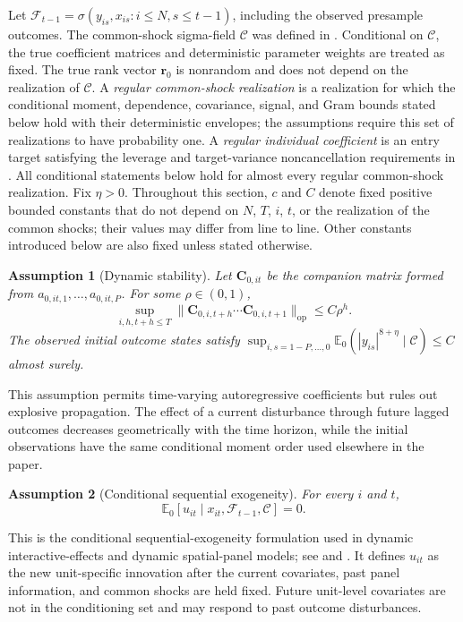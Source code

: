 \documentclass[11pt]{article}
\numberwithin{equation}{section}
\newtheorem{assumption}{Assumption}
\theoremstyle{remark}
\newcommand{\Ezero}{\mathbb E_0}
\newcommand{\op}{\operatorname{op}}
\newcommand{\br}{\bm r}
\newcommand{\bC}{\bm C}
\begin{document}
Let $\mathscr F_{t-1}=\sigma(y_{is},x_{is}:i\le N,s\le t-1)$, including the observed presample outcomes. The common-shock sigma-field $\mathscr C$ was defined in . Conditional on $\mathscr C$, the true coefficient matrices and deterministic parameter weights are treated as fixed. The true rank vector $\br_0$ is nonrandom and does not depend on the realization of $\mathscr C$. A \emph{regular common-shock realization} is a realization for which the conditional moment, dependence, covariance, signal, and Gram bounds stated below hold with their deterministic envelopes; the assumptions require this set of realizations to have probability one. A \emph{regular individual coefficient} is an entry target satisfying the leverage and target-variance noncancellation requirements in . All conditional statements below hold for almost every regular common-shock realization. Fix $\eta>0$. Throughout this section, $c$ and $C$ denote fixed positive bounded constants that do not depend on $N$, $T$, $i$, $t$, or the realization of the common shocks; their values may differ from line to line. Other constants introduced below are also fixed unless stated otherwise.

\begin{assumption}[Dynamic stability]
\label{a:stab}
Let $\bC_{0,it}$ be the companion matrix formed from $a_{0,it,1},\ldots,a_{0,it,P}$. For some $\rho\in(0,1)$,
\begin{equation}
\label{eq:stability}
\sup_{i,h,t+h\le T}
\|\bC_{0,i,t+h}\cdots\bC_{0,i,t+1}\|_{\op}
\le C\rho^h.
\end{equation}
The observed initial outcome states satisfy $\sup_{i,s=1-P,\ldots,0}\Ezero(|y_{is}|^{8+\eta}\mid\mathscr C)\le C$ almost surely.
\end{assumption}
This assumption permits time-varying autoregressive coefficients but rules out explosive propagation. The effect of a current disturbance through future lagged outcomes decreases geometrically with the time horizon, while the initial observations have the same conditional moment order used elsewhere in the paper.

\begin{assumption}[Conditional sequential exogeneity]
\label{a:exog}
For every $i$ and $t$,
\begin{equation}
\label{eq:conditional_exogeneity}
\Ezero[u_{it}\mid x_{it},\mathscr F_{t-1},\mathscr C]=0.
\end{equation}
\end{assumption}
This is the conditional sequential-exogeneity formulation used in dynamic interactive-effects and dynamic spatial-panel models; see \citet{moonweidner2017} and \citet{kuersteinerprucha2020}. It defines $u_{it}$ as the new unit-specific innovation after the current covariates, past panel information, and common shocks are held fixed. Future unit-level covariates are not in the conditioning set and may respond to past outcome disturbances.
\end{document}
